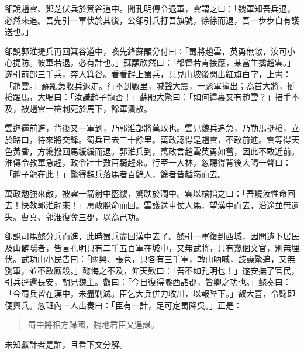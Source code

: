 卻說趙雲、鄧芝伏兵於箕谷道中。聞孔明傳令退軍，雲謂芝曰：「魏軍知吾兵退，必然來追。吾先引一軍伏於其後，公卻引兵打吾旗號，徐徐而退，吾一步步自有護送也。」

卻說郭淮提兵再回箕谷道中，喚先鋒蘇顒分付曰：「蜀將趙雲，英勇無敵，汝可小心提防。彼軍若退，必有計也。」蘇顒欣然曰：「都督若肯接應，某當生擒趙雲。」遂引前部三千兵，奔入箕谷。看看趕上蜀兵，只見山坡後閃出紅旗白字，上書：「趙雲。」蘇顒急收兵退走。行不到數里，喊聲大震，一彪軍撞出；為首大將，挺槍躍馬，大喝曰：「汝識趙子龍否！」蘇顒大驚曰：「如何這裏又有趙雲？」措手不及，被趙雲一槍刺死於馬下，餘軍潰散。

雲迤邐前進，背後又一軍到，乃郭淮部將萬政也。雲見魏兵追急，乃勒馬挺槍，立於路口，待來將交鋒。蜀兵已去三十餘里。萬政認得是趙雲，不敢前進。雲等得天色黃昏，方纔撥回馬緩緩而退。郭淮兵到，萬政言趙雲英勇如舊，因此不敢近前。淮傳令教軍急趕，政令壯士數百騎趕來。行至一大林，忽聽得背後大喝一聲曰：「趙子龍在此！」驚得魏兵落馬者百餘人，餘者皆越嶺而去。

萬政勉強來敵，被雲一箭射中盔纓，驚跌於澗中。雲以槍指之曰：「吾饒汝性命回去！快教郭淮趕來！」萬政脫命而回。雲護送車仗人馬，望漢中而去，沿途並無遺失。曹真、郭淮復奪三郡，以為己功。

卻說司馬懿分兵而進，此時蜀兵盡回漢中去了。懿引一軍復到西城，因問遺下居民及山僻隱者，皆言孔明只有二千五百軍在城中，又無武將，只有幾個文官，別無埋伏。武功山小民告曰：「關興、張苞，只各有三千軍，轉山吶喊，鼓譟驚追，又無別軍，並不敢廝殺。」懿悔之不及，仰天歎曰：「吾不如孔明也！」遂安撫了官民，引兵逕還長安，朝見魏主。叡曰：「今日復得隴西諸郡，皆卿之功也。」懿奏曰：「今蜀兵皆在漢中，未盡剿滅。臣乞大兵併力收川，以報陛下。」叡大喜，令懿即便興兵。忽班內一人出奏曰：「臣有一計，足可定蜀降吳。」正是：

\begin{quote}
蜀中將相方歸國，魏地君臣又逞謀。
\end{quote}

未知獻計者是誰，且看下文分解。
